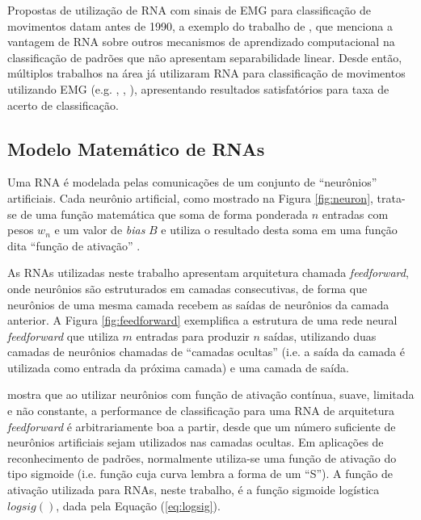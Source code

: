 Propostas de utilização de RNA com sinais de EMG para classificação de movimentos datam antes de 1990, a exemplo do trabalho de , que menciona a vantagem de RNA sobre outros mecanismos de aprendizado computacional na classificação de padrões que não apresentam separabilidade linear. Desde então, múltiplos trabalhos na área já utilizaram RNA para classificação de movimentos utilizando EMG (e.g. , , ), apresentando resultados satisfatórios para taxa de acerto de classificação.

			\subsection{Modelo Matemático de RNAs}

Uma RNA é modelada pelas comunicações de um conjunto de ``neurônios'' artificiais. Cada neurônio artificial, como mostrado na Figura \ref{fig:neuron}, trata-se de uma função matemática que soma de forma ponderada $n$ entradas com pesos $w_n$ e um valor de \emph{bias} $B$ e utiliza o resultado desta soma em uma função dita ``função de ativação'' \cite{Tanikic2012}.




As RNAs utilizadas neste trabalho apresentam arquitetura chamada \emph{feedforward}, onde neurônios são estruturados em camadas consecutivas, de forma que neurônios de uma mesma camada recebem as saídas de neurônios da camada anterior. A Figura \ref{fig:feedforward} exemplifica a estrutura de uma rede neural \emph{feedforward} que utiliza $m$ entradas para produzir $n$ saídas, utilizando duas camadas de neurônios chamadas de ``camadas ocultas'' (i.e. a saída da camada é utilizada como entrada da próxima camada) e uma camada de saída.



 mostra que ao utilizar neurônios com função de ativação contínua, suave, limitada e não constante, a performance de classificação para uma RNA de arquitetura \emph{feedforward} é arbitrariamente boa a partir, desde que um número suficiente de neurônios artificiais sejam utilizados nas camadas ocultas. Em aplicações de reconhecimento de padrões, normalmente utiliza-se uma função de ativação do tipo sigmoide (i.e. função cuja curva lembra a forma de um ``S'').  A função de ativação utilizada para RNAs, neste trabalho, é a função sigmoide logística $logsig()$, dada pela Equação (\ref{eq:logsig}).

